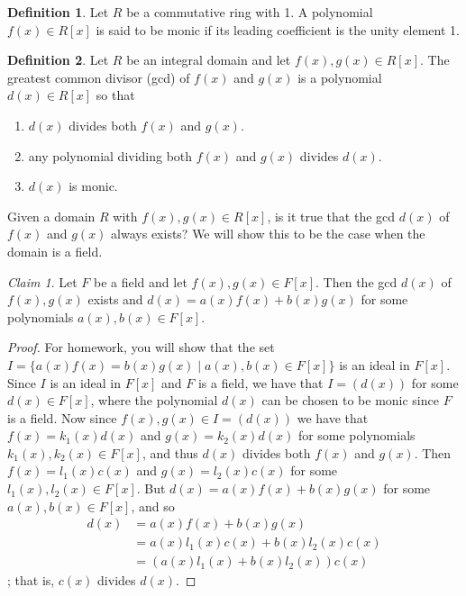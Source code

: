 \documentclass[12pt,letterpaper,DIV=11,final]{scrartcl}
\theoremstyle{plain}
\theoremstyle{definition}
\newtheorem{definition}{Definition}[section]
\theoremstyle{remark}
\newtheorem{claim}{Claim}
\begin{document}
\begin{definition}
  Let $R$ be a commutative ring with 1.
  A polynomial $f(x) \in R[x]$ is said to be monic if its leading coefficient is the unity element 1.
\end{definition}

\begin{definition}
  Let $R$ be an integral domain and let $f(x), g(x) \in R[x]$.
  The greatest common divisor (gcd) of $f(x)$ and $g(x)$ is a polynomial $d(x) \in R[x]$ so that
  \begin{enumerate}
    \item $d(x)$ divides both $f(x)$ and $g(x)$.
    \item any polynomial dividing both $f(x)$ and $g(x)$ divides $d(x)$.
    \item $d(x)$ is monic.
  \end{enumerate}
\end{definition}

Given a domain $R$ with $f(x), g(x) \in R[x]$, is it true that the gcd $d(x)$ of $f(x)$ and $g(x)$ always exists?
We will show this to be the case when the domain is a field.

\begin{claim}
  Let $F$ be a field and let $f(x), g(x) \in F[x]$.
  Then the gcd $d(x)$ of $f(x), g(x)$ exists and $d(x) = a(x) f(x) + b(x) g(x)$ for some polynomials $a(x), b(x) \in F[x]$.

  \begin{proof}
    For homework, you will show that the set $I = \{ a(x) f(x) = b(x) g(x) \mid a(x), b(x) \in F[x] \}$ is an ideal in $F[x]$.
    Since $I$ is an ideal in $F[x]$ and $F$ is a field, we have that $I = \left( d(x) \right)$ for some $d(x) \in F[x]$, where the polynomial $d(x)$ can be chosen to be monic since $F$ is a field.
    Now since $f(x), g(x) \in I = \left( d(x) \right)$ we have that $f(x) = k_1(x) d(x)$ and $g(x) = k_2(x) d(x)$ for some polynomials $k_1(x), k_2(x) \in F[x]$, and thus $d(x)$ divides both $f(x)$ and $g(x)$.
    Then $f(x) = l_1(x) c(x)$ and $g(x) = l_2(x) c(x)$ for some $l_1(x), l_2(x) \in F[x]$.
    But $d(x) = a(x) f(x) + b(x) g(x)$ for some $a(x), b(x) \in F[x]$, and so
    \begin{align*}
      d(x) &= a(x) f(x) + b(x) g(x) \\
           &= a(x) l_1(x) c(x) + b(x) l_2(x) c(x) \\
           &= \left( a(x) l_1(x) + b(x) l_2(x) \right) c(x)
    \end{align*};
    that is, $c(x)$ divides $d(x)$.
  \end{proof}
\end{claim}
\end{document}
